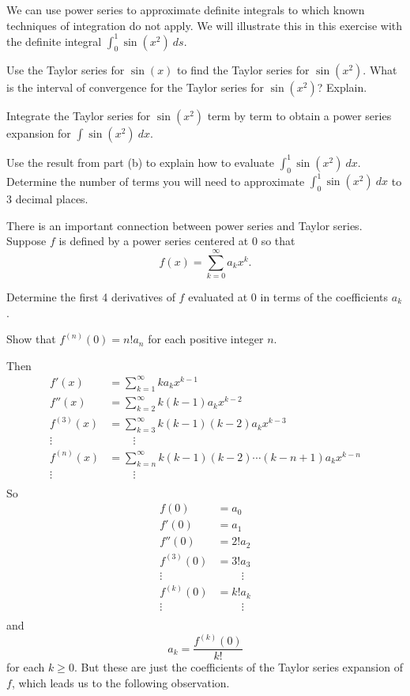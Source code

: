 \begin{exercises}

\item We can use power series to approximate definite integrals to which known techniques of integration do not apply. We will illustrate this in this exercise with the definite integral $\int_0^1 \sin(x^2) \ ds$.
    \ba
    \item Use the Taylor series for $\sin(x)$ to find the Taylor series for $\sin(x^2)$. What is the interval of convergence for the Taylor series for $\sin(x^2)$? Explain.

    \item Integrate the Taylor series for $\sin(x^2)$ term by term to obtain a power series expansion for $\int \sin(x^2) \ dx$.

    \item Use the result from part (b) to explain how to evaluate $\int_0^1 \sin(x^2) \ dx$. Determine the number of terms you will need to approximate $\int_0^1 \sin(x^2) \ dx$ to 3 decimal places.

    \ea

\item \label{ex:8.5.2} There is an important connection between power series and Taylor series. Suppose $f$ is defined by a power series centered at 0 so that
\[f(x) = \sum_{k=0}^{\infty} a_kx^k.\]
    \ba
    \item Determine the first 4 derivatives of $f$ evaluated at 0 in terms of the coefficients $a_k$.

    \item Show that $f^{(n)}(0) = n!a_n$ for each positive integer $n$.

\begin{exerciseSolution}
Then
\begin{align*}
f'(x) &= \sum_{k=1}^{\infty} ka_kx^{k-1} \\
f''(x) &= \sum_{k=2}^{\infty} k(k-1)a_kx^{k-2} \\
f^{(3)}(x) &= \sum_{k=3}^{\infty} k(k-1)(k-2)a_kx^{k-3} \\
\vdots & \ \qquad \vdots \\
f^{(n)}(x) &= \sum_{k=n}^{\infty} k(k-1)(k-2) \cdots (k-n+1) a_kx^{k-n} \\
\vdots & \ \qquad \vdots \\
\end{align*}
So
\begin{align*}
f(0) &= a_0 \\
f'(0) &= a_1 \\
f''(0) &= 2!a_2 \\
f^{(3)}(0) &= 3!a_3 \\
\vdots & \ \qquad \vdots \\
f^{(k)}(0) &= k!a_k \\
\vdots & \ \qquad \vdots \\
\end{align*}
and
\[a_k = \frac{f^{(k)}(0)}{k!}\]
for each $k \geq 0$. But these are just the coefficients of the Taylor series expansion of $f$, which leads us to the following observation.


\end{exerciseSolution}
\end{exercises}
